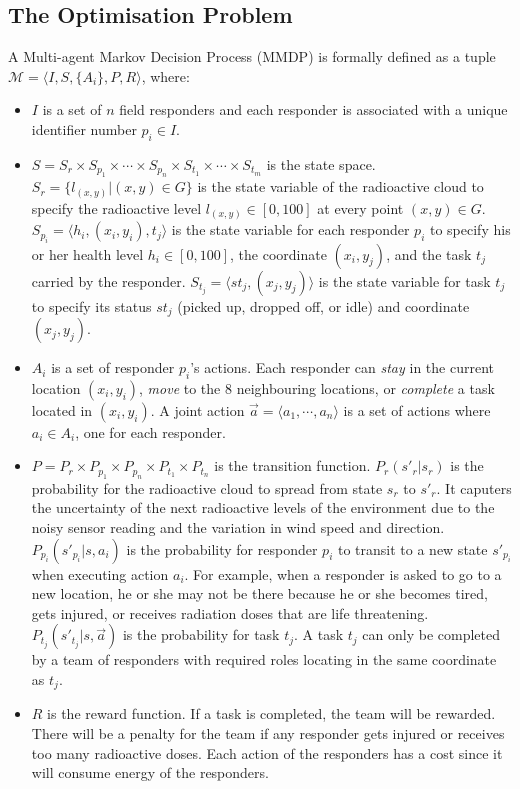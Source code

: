 \subsection{The Optimisation Problem}
\noindent A Multi-agent Markov Decision Process (MMDP) is formally
defined as a tuple $\mathcal{M} = \langle I, S, \{A_i\}, P, R
\rangle$, where:
\begin{itemize}
  \item $I$ is a set of $n$ field responders and each responder
      is associated with a unique identifier number $p_i\in I$.
  \item $S = S_r \times S_{p_1} \times \cdots \times S_{p_n}
      \times S_{t_1} \times \cdots \times S_{t_m}$ is the state
      space. $S_r = \{l_{(x,y)}| (x, y) \in G\}$ is the state
      variable of the radioactive cloud to specify the
      radioactive level $l_{(x,y)}\in[0, 100]$ at every point
      $(x, y)\in G$. $S_{p_i} = \langle h_i, (x_i, y_i), t_j
      \rangle$ is the state variable for each responder $p_i$
      to specify his or her health level $h_i\in[0, 100]$, the
      coordinate $(x_i, y_j)$, and the task $t_j$ carried by
      the responder. $S_{t_j} = \langle st_j, (x_j, y_j)
      \rangle$ is the state variable for task $t_j$ to specify
      its status $st_j$ (picked up, dropped off, or idle) and
      coordinate $(x_j, y_j)$.
  \item $A_i$ is a set of responder $p_i$'s actions. Each
      responder can {\em stay} in the current location $(x_i,
      y_i)$, {\em move} to the 8 neighbouring locations, or
      {\em complete} a task located in $(x_i, y_i)$. A joint
      action $\vec{a}=\langle a_1, \cdots, a_n \rangle$ is a
      set of actions where $a_i\in A_i$, one for each
      responder.
  \item $P = P_r \times P_{p_1} \times P_{p_n} \times P_{t_1}
      \times P_{t_n}$ is the transition function.
      $P_r(s'_r|s_r)$ is the probability for the radioactive
      cloud to spread from state $s_r$ to $s'_r$. It caputers
      the uncertainty of the next radioactive levels of the
      environment due to the noisy sensor reading and the
      variation in wind speed and direction.
      $P_{p_i}(s'_{p_i}|s, a_i)$ is the probability for
      responder $p_i$ to transit to a new state $s'_{p_i}$ when
      executing action $a_i$. For example, when a responder is
      asked to go to a new location, he or she may not be there
      because he or she becomes tired, gets injured, or
      receives radiation doses that are life threatening.
      $P_{t_j}(s'_{t_j}|s, \vec{a})$ is the probability for
      task $t_j$. A task $t_j$ can only be completed by a team
      of responders with required roles locating in the same
      coordinate as $t_j$.
  \item $R$ is the reward function. If a task is completed, the
      team will be rewarded. There will be a penalty for the
      team if any responder gets injured or receives too many
      radioactive doses. Each action of the responders has a
      cost since it will consume energy of the responders.
\end{itemize}

